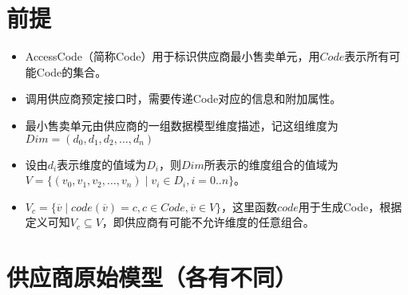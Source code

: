 \documentclass[a4paper]{article}
\begin{document}
\section{前提}

\begin{itemize}

\item AccessCode（简称Code）用于标识供应商最小售卖单元，用$Code$表示所有可能Code的集合。

\item 调用供应商预定接口时，需要传递Code对应的信息和附加属性。

\item 最小售卖单元由供应商的一组数据模型维度描述，记这组维度为$Dim=(d_0,d_1,d_2,\dots,d_n)$

\item 设由${d_i}$表示维度的值域为$D_i$，则$Dim$所表示的维度组合的值域为$V = \{( v_0,v_1,v_2,\dots,v_n) \mid v_i \in D_i, i = 0..n\}$。

\item $V_c = \{ \overline v \mid code(\overline v) = c, c \in Code, \overline v \in V\}$，这里函数$code$用于生成Code，根据定义可知$V_c \subseteq V$，即供应商有可能不允许维度的任意组合。
\end{itemize}

\section{ 供应商原始模型（各有不同）}
\end{document}
